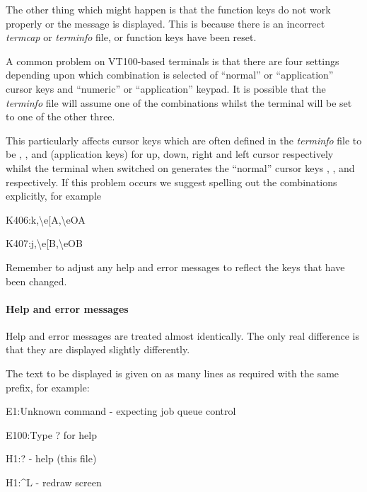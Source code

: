 The other thing which might happen is that the function keys do not work properly or the message 
is displayed. This is because there is an incorrect \textit{termcap} or \textit{terminfo} file, or function keys have been reset.

A common problem on VT100-based terminals is that there are four settings depending upon which combination is selected of
``normal'' or ``application'' cursor keys and ``numeric'' or ``application'' keypad. It is possible that
the \textit{terminfo} file will assume one of the combinations whilst the terminal will be set to one of the other three.

This particularly affects cursor keys which are often defined in the \textit{terminfo} file to be
, ,  and
 (application keys) for up, down, right and left cursor respectively whilst the terminal when
switched on generates the ``normal'' cursor keys \exampletext{{\textbackslash}e[A}, \exampletext{{\textbackslash}e[B},
\exampletext{{\textbackslash}e[C} and \exampletext{{\textbackslash}e[D} respectively.
If this problem occurs we suggest spelling out the combinations explicitly, for example

\begin{expara}

K406:k,{\textbackslash}e[A,{\textbackslash}eOA

K407:j,{\textbackslash}e[B,{\textbackslash}eOB

\end{expara}

Remember to adjust any help and error messages to reflect the keys that have been changed.

\paragraph{Help and error messages}
Help and error messages are treated almost identically. The only real difference is that they are displayed slightly differently.

The text to be displayed is given on as many lines as required with the same prefix, for example:

\begin{expara}

E1:Unknown command - expecting job queue control

E100:Type ? for help

H1:? - help (this file)

H1:\^{}L - redraw screen

\end{expara}

